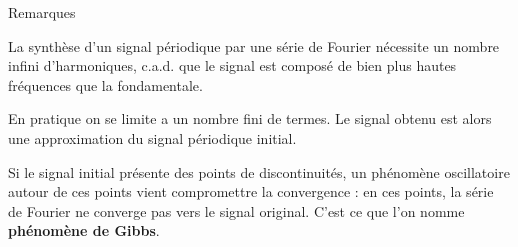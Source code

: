 \documentclass{beamer}
\begin{document}
\begin{frame}
\begin{alertblock}{Remarques}
\itemize \justifying
\item La synthèse d'un signal périodique par une série de Fourier
nécessite un nombre infini d'harmoniques, c.a.d. que
le signal est composé de bien plus hautes fréquences que la
fondamentale.
\pause
\item En pratique on se limite a un nombre fini de termes. Le signal
obtenu est alors une approximation du signal périodique initial.
\pause
\item Si le signal initial présente des points de discontinuités, un phénomène
oscillatoire autour de ces points vient compromettre la convergence : en ces
points, la série de Fourier ne converge pas vers le signal original. C'est ce
que l'on nomme \textbf{phénomène de Gibbs}.
\end{alertblock}
\end{frame}
\end{document}
